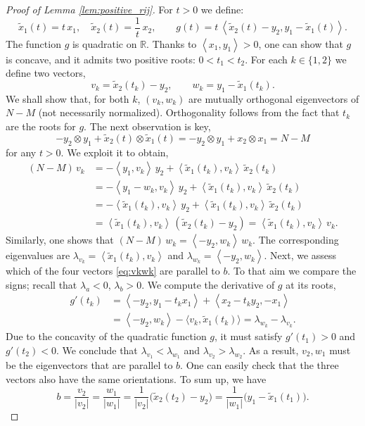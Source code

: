\documentclass[11pt,letterpaper,reqno]{amsart}
\theoremstyle{definition}
\numberwithin{equation}{section}
\newcommand{\R}{\mathbb{R}}
\newcommand{\pairing}[1]{{\left \langle #1 \right \rangle}}
\newcommand{\abs}[1]{{\left \lvert #1 \right \rvert}}
\begin{document}
{\begin{proof}[Proof of Lemma \ref{lem:positive_rij}]
	For $t >0$ we define:
	\begin{equation*}
		\tilde{x}_1(t) = t \,x_1, \quad \tilde{x}_2(t) = \frac{1}{t} \, x_2, \qquad g(t) = t \, \pairing{\tilde{x}_2(t) - y_2, y_1 - \tilde{x}_1(t)}.
	\end{equation*}
	The function $g$ is quadratic on $\R$. Thanks to $\pairing{x_1,y_1}>0$, one can show that $g$ is concave, and it admits two positive roots: $0< t_1 < t_2$. For each $k\in \{1,2\}$ we define two vectors,
	\begin{equation}
		\label{eq:vkwk}
		v_k= \tilde{x}_2(t_k)- y_2, \qquad w_k =  y_1 - \tilde{x}_1(t_k).
	\end{equation}
	We shall show that, for both $k$, $(v_k,w_k)$ are mutually orthogonal eigenvectors of $N-M$ (not necessarily normalized). Orthogonality follows from the fact that $t_k$ are the roots for $g$. The next observation is key,
	\begin{equation*}
		-y_2 \otimes y_1 +\tilde{x}_2(t) \otimes \tilde{x}_1(t) = -y_2 \otimes y_1 + x_2 \otimes x_1 = N-M
	\end{equation*}
	for any $t>0$. We exploit it to obtain,
	\begin{align*}
		(N-M)\, v_{k} &=  -\pairing{y_1,v_{k}} \, y_2  + \pairing{\tilde{x}_1(t_k), v_{k}}\,\tilde{x}_2(t_k) \\
		&= -\pairing{y_1-w_{k},v_{k}} \, y_2  +\pairing{\tilde{x}_1(t_k), v_{k}}\,\tilde{x}_2(t_k)  \\ 
		&= -  \pairing{\tilde{x}_1(t_k),v_{k}} \, y_2 +  \pairing{\tilde{x}_1(t_k), v_{k}}\,\tilde{x}_2(t_k)  \\
		&=  \pairing{\tilde{x}_1(t_k),v_{k}}\, ( \tilde{x}_2(t_k) - y_2) = \pairing{\tilde{x}_1(t_k),v_{k}} \, v_{k}.
	\end{align*}
	Similarly, one shows that $(N-M)\, w_{k} =  \pairing{-y_2,w_{k}} \, w_{k}$. The corresponding eigenvalues are  $\lambda_{v_k} =  \pairing{\tilde{x}_1(t_k),v_{k}}$ and $\lambda_{w_k} =  \pairing{-y_2,w_{k}}$. Next, we assess which of the four vectors \eqref{eq:vkwk}  are parallel to $b$. To that aim we  compare the signs; recall that $\lambda_a<0$, $\lambda_b >0$. We compute the derivative of $g$ at its roots,
	\begin{align*}
		g'(t_k) &= 	\pairing{-y_2, y_1 - t_k x_1} +  \pairing{x_2- t_k y_2,- x_1} \\
		&= \pairing{-y_2, w_k} -  \langle v_k, \tilde{x}_1(t_k) \rangle  = \lambda_{w_k} - \lambda_{v_k}.
	\end{align*}
	Due to the concavity of the quadratic function $g$, it must satisfy $g'(t_1) >0$ and $g'(t_2)<0$. We conclude that  $\lambda_{v_1} < \lambda_{w_1}$ and $\lambda_{v_2} > \lambda_{w_2}$. As a result, $v_2, w_1$ must be the eigenvectors that are parallel to $b$. One can easily check that the three vectors also have the same orientations. To sum up, we have
	\begin{equation}
		\label{eq:ne}
		b= \frac{v_{2}}{\abs{v_{2}}}=\frac{w_{1}}{\abs{w_{1}}}   =  \frac{1}{\abs{v_{2}}} \big( \tilde{x}_2(t_2)- y_2 \big) = \frac{1}{\abs{w_{1}}}   \big(y_1 - \tilde{x}_1(t_1) \big).
	\end{equation}
	

\end{proof}}
\end{document}
